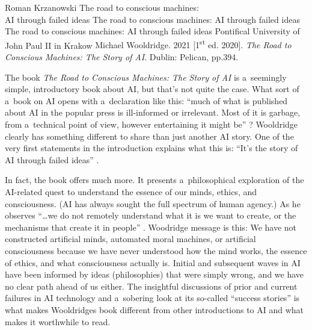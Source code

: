 \begin{newrevengenv}{Roman Krzanowski}
	{The road to conscious machines:\\
	AI through failed ideas}
	{The road to conscious machines: AI through failed ideas}
	{The road to conscious machines: AI through failed ideas}
	{Pontifical University of John Paul II in Krakow}
	{Michael Wooldridge. 2021 [1\textsuperscript{st} ed. 2020]. \textit{The Road to Conscious Machines: The Story of AI}. Dublin: Pelican, pp.394.}


\lettrine[loversize=0.13,lines=2,lraise=-0.03,nindent=0em,findent=0.2pt]%
{T}{}he book \textit{The Road to Conscious Machines: The Story of AI} is a~seemingly simple, introductory book about AI, but that’s not quite the case. What sort of a~book on AI opens with a~declaration like this: ``much of what is published about AI in the popular press is ill-informed or irrelevant. Most of it is garbage, from a~technical point of view, however entertaining it might be''
\parencite[][p.3]{wooldridge_road_2021}?
Wooldridge clearly has something different to share than just another AI story. One of the very first statements in the introduction explains what this is: ``It’s the story of AI through failed ideas''
\parencite[][p.1]{wooldridge_road_2021}.

In fact, the book offers much more. It presents a~philosophical exploration of the AI-related quest to understand the essence of our minds, ethics, and consciousness. (AI has always sought the full spectrum of human agency.) As he observes ``…we do not remotely understand what it is we want to create, or the mechanisms that create it in people''
\parencite[][p.2]{wooldridge_road_2021}.
Woodridge message is this: We have not constructed artificial minds, automated moral machines, or artificial consciousness because we have never understood how the mind works, the essence of ethics, and what consciousness actually is. Initial and subsequent waves in AI have been informed by ideas (philosophies) that were simply wrong, and we have no clear path ahead of us either. The insightful discussions of prior and current failures in AI technology and a~sobering look at its so-called ``success stories'' is what makes Wooldridge{\textasciigrave}s book different from other introductions to AI and what makes it worthwhile to read.


\end{newrevengenv}
